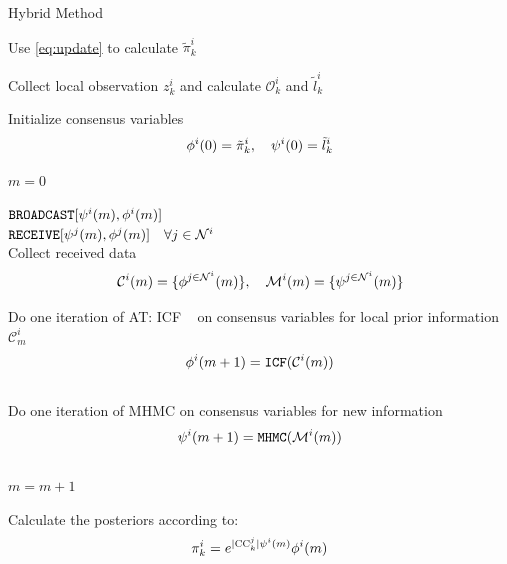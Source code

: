 \documentclass[conference]{IEEEtran}
\theoremstyle{remark}
\newcommand{\axx}[1]{{\color{blue} AT: #1  \ }}  %
\newcommand{\yy}[3][2]{\psi^{\tiny #3}({\tiny #2})}
\newcommand{\YY}[3][2]{\phi^{\tiny #3}({\tiny #2})}
\begin{document}
\begin{algorithm}[!ht]
	\label{alg:inf-predict}
	\caption{Hybrid Method}
	Use \eqref{eq:update} to calculate  $\tilde{\pi}^i_{k}$
	
	Collect local observation ${z}^i_{k}$ and calculate ${\mathcal{O}}^i_{k}$ 
	and $\tilde{l}_k^i$
	
	Initialize consensus variables
	\begin{equation*}
	\YY[]{0}{i} = \tilde{\pi}^i_{k}, \quad \yy[]{0}{i} = \tilde{l}_k^i
	\end{equation*}
	
	$m=0$\\
	{ $\texttt{BROADCAST}[ \yy[]{m}{i}, \YY[]{m}{i}]$\\
		$\texttt{RECEIVE}[ \yy[]{m}{j}, \YY[]{m}{j} ] \quad \forall j \in 
		\mathcal{N}^i$\\	
		Collect received data 
		\begin{equation*}
		\mathcal{C}^i(m)=\{  \YY[]{m}{j \in  \mathcal{N}^i} \}, \quad 	
		\mathcal{M}^i(m)=\{  \yy[]{m}{j \in  \mathcal{N}^i} \}
		\end{equation*}
		
		Do one iteration of \axx{ICF} on consensus variables for local prior 
		information $\mathcal{C}^i_m$
		$$ \YY[]{m+1}{i}=\texttt{ICF}(\mathcal{C}^i(m))$$\\
		Do one iteration of MHMC on consensus variables for new 
		information 		$$ \yy[]{m+1}{i}=\texttt{MHMC}(\mathcal{M}^i(m))$$\\
		$m=m+1$\\
	}
	Calculate the posteriors according to:
	\begin{equation*}
	{\pi}^i_{k} = e^{|\textsc{CC}^j_k|\yy[]{m}{i}}\YY[]{m}{i}
	\end{equation*}
\end{algorithm}
\end{document}
